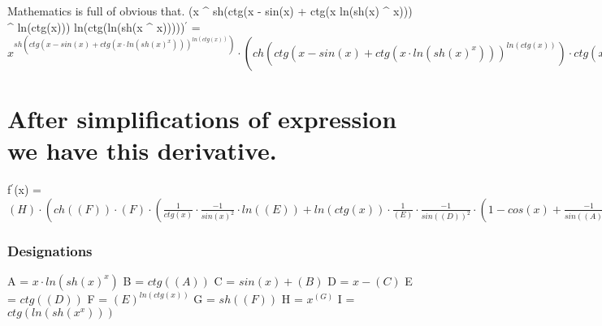 \documentclass{article}
\begin{document}
{\large Mathematics is full of obvious that. 
\newline\newline
(x ^ {sh(ctg(x - sin(x) + ctg(x \cdot ln(sh(x) ^ {x}))) ^ {ln(ctg(x))})} \cdot ln(ctg(ln(sh(x ^ {x})))))$^{'}$ = $x ^ {sh(ctg(x - sin(x) + ctg(x \cdot ln(sh(x) ^ {x}))) ^ {ln(ctg(x))})} \cdot (ch(ctg(x - sin(x) + ctg(x \cdot ln(sh(x) ^ {x}))) ^ {ln(ctg(x))}) \cdot ctg(x - sin(x) + ctg(x \cdot ln(sh(x) ^ {x}))) ^ {ln(ctg(x))} \cdot (\frac{1}{ctg(x)} \cdot \frac{-1}{sin(x) ^ {2}} \cdot 1 \cdot ln(ctg(x - sin(x) + ctg(x \cdot ln(sh(x) ^ {x})))) + ln(ctg(x)) \cdot \frac{1}{ctg(x - sin(x) + ctg(x \cdot ln(sh(x) ^ {x})))} \cdot \frac{-1}{sin(x - sin(x) + ctg(x \cdot ln(sh(x) ^ {x}))) ^ {2}} \cdot (1 - cos(x) \cdot 1 + \frac{-1}{sin(x \cdot ln(sh(x) ^ {x})) ^ {2}} \cdot (1 \cdot ln(sh(x) ^ {x}) + x \cdot \frac{1}{sh(x) ^ {x}} \cdot sh(x) ^ {x} \cdot (1 \cdot ln(sh(x)) + x \cdot \frac{1}{sh(x)} \cdot ch(x) \cdot 1)))) \cdot ln(x) + sh(ctg(x - sin(x) + ctg(x \cdot ln(sh(x) ^ {x}))) ^ {ln(ctg(x))}) \cdot \frac{1}{x} \cdot 1) \cdot ln(ctg(ln(sh(x ^ {x})))) + x ^ {sh(ctg(x - sin(x) + ctg(x \cdot ln(sh(x) ^ {x}))) ^ {ln(ctg(x))})} \cdot \frac{1}{ctg(ln(sh(x ^ {x})))} \cdot \frac{-1}{sin(ln(sh(x ^ {x}))) ^ {2}} \cdot \frac{1}{sh(x ^ {x})} \cdot ch(x ^ {x}) \cdot x ^ {x} \cdot (1 \cdot ln(x) + x \cdot \frac{1}{x} \cdot 1)$} 
\section*{\centering After simplifications of expression we have this derivative.}
{\large f$^{'}$(x) = $(H) \cdot (ch((F)) \cdot (F) \cdot (\frac{1}{ctg(x)} \cdot \frac{-1}{sin(x) ^ {2}} \cdot ln((E)) + ln(ctg(x)) \cdot \frac{1}{(E)} \cdot \frac{-1}{sin((D)) ^ {2}} \cdot (1 - cos(x) + \frac{-1}{sin((A)) ^ {2}} \cdot (ln(sh(x) ^ {x}) + x \cdot \frac{1}{sh(x) ^ {x}} \cdot sh(x) ^ {x} \cdot (ln(sh(x)) + x \cdot \frac{1}{sh(x)} \cdot ch(x))))) \cdot ln(x) + (G) \cdot \frac{1}{x}) \cdot ln((I)) + (H) \cdot \frac{1}{(I)} \cdot \frac{-1}{sin(ln(sh(x ^ {x}))) ^ {2}} \cdot \frac{1}{sh(x ^ {x})} \cdot ch(x ^ {x}) \cdot x ^ {x} \cdot (ln(x) + x \cdot \frac{1}{x})$}

{ \subsubsection*{\centering Designations}}
{
  A = $x \cdot ln(sh(x) ^ {x})$\newline
  B = $ctg((A))$\newline
  C = $sin(x) + (B)$\newline
  D = $x - (C)$\newline
  E = $ctg((D))$\newline
  F = $(E) ^ {ln(ctg(x))}$\newline
  G = $sh((F))$\newline
  H = $x ^ {(G)}$\newline
  I = $ctg(ln(sh(x ^ {x})))$
}
\end{document}
